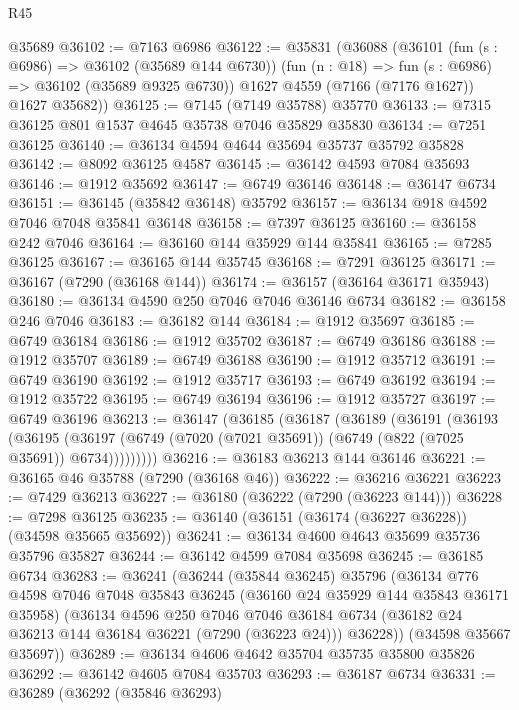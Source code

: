 \begin{lexlean}{R45}
\begin{coremodule}
{    @35689
@36102 := @7163 @6986
@36122 := @35831
    (@36088
      (@36101
        (fun (s : @6986) => @36102 (@35689 @144 @6730))
        (fun (n : @18) => fun (s : @6986) => @36102 (@35689 @9325 @6730))
        @1627
        @4559
        (@7166 (@7176 @1627))
        @1627
        @35682))
@36125 := @7145 (@7149 @35788) @35770
@36133 := @7315 @36125 @801 @1537 @4645 @35738 @7046 @35829 @35830
@36134 := @7251 @36125
@36140 := @36134 @4594 @4644 @35694 @35737 @35792 @35828
@36142 := @8092 @36125 @4587
@36145 := @36142 @4593 @7084 @35693
@36146 := @1912 @35692
@36147 := @6749 @36146
@36148 := @36147 @6734
@36151 := @36145 (@35842 @36148) @35792
@36157 := @36134 @918 @4592 @7046 @7048 @35841 @36148
@36158 := @7397 @36125
@36160 := @36158 @242 @7046
@36164 := @36160 @144 @35929 @144 @35841
@36165 := @7285 @36125
@36167 := @36165 @144 @35745
@36168 := @7291 @36125
@36171 := @36167 (@7290 (@36168 @144))
@36174 := @36157 (@36164 @36171 @35943)
@36180 := @36134 @4590 @250 @7046 @7046 @36146 @6734
@36182 := @36158 @246 @7046
@36183 := @36182 @144
@36184 := @1912 @35697
@36185 := @6749 @36184
@36186 := @1912 @35702
@36187 := @6749 @36186
@36188 := @1912 @35707
@36189 := @6749 @36188
@36190 := @1912 @35712
@36191 := @6749 @36190
@36192 := @1912 @35717
@36193 := @6749 @36192
@36194 := @1912 @35722
@36195 := @6749 @36194
@36196 := @1912 @35727
@36197 := @6749 @36196
@36213 := @36147
    (@36185
      (@36187
        (@36189
          (@36191
            (@36193
              (@36195
                (@36197 (@6749 (@7020 (@7021 @35691)) (@6749 (@822 (@7025 @35691)) @6734)))))))))
@36216 := @36183 @36213 @144 @36146
@36221 := @36165 @46 @35788 (@7290 (@36168 @46))
@36222 := @36216 @36221
@36223 := @7429 @36213
@36227 := @36180 (@36222 (@7290 (@36223 @144)))
@36228 := @7298 @36125
@36235 := @36140 (@36151 (@36174 (@36227 @36228)) (@34598 @35665 @35692))
@36241 := @36134 @4600 @4643 @35699 @35736 @35796 @35827
@36244 := @36142 @4599 @7084 @35698
@36245 := @36185 @6734
@36283 := @36241
    (@36244
      (@35844 @36245)
      @35796
      (@36134
        @776
        @4598
        @7046
        @7048
        @35843
        @36245
        (@36160 @24 @35929 @144 @35843 @36171 @35958)
        (@36134
          @4596
          @250
          @7046
          @7046
          @36184
          @6734
          (@36182 @24 @36213 @144 @36184 @36221 (@7290 (@36223 @24)))
          @36228))
      (@34598 @35667 @35697))
@36289 := @36134 @4606 @4642 @35704 @35735 @35800 @35826
@36292 := @36142 @4605 @7084 @35703
@36293 := @36187 @6734
@36331 := @36289
    (@36292
      (@35846 @36293)
}
\end{coremodule}
\end{lexlean}
